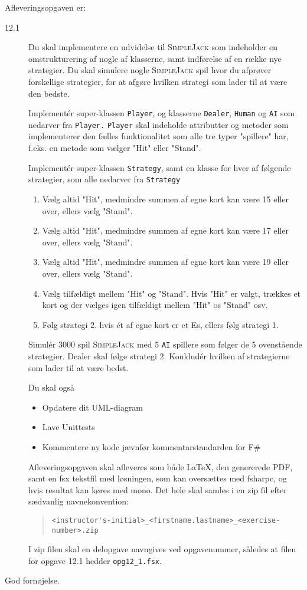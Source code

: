 \documentclass[a4paper,12pt]{article}
\newcommand{\sbl}{\textsc{SimpleJack }}
\begin{document}
Afleveringsopgaven er:
\begin{description}
\item[12.1] Du skal implementere en udvidelse til \sbl som indeholder en omstrukturering af nogle af klasserne, samt indførelse af en række nye strategier. Du skal simulere nogle \sbl spil hvor du afprøver forskellige strategier, for at afgøre
  hvilken strategi som lader til at være den bedste.

  Implementér super-klassen \texttt{Player}, og klasserne \texttt{Dealer}, \texttt{Human} og \texttt{AI} som nedarver fra \texttt{Player.} \texttt{Player} skal indeholde attributter og metoder som implementerer den fælles funktionalitet
  som alle tre typer "spillere" har, f.eks. en metode som vælger "Hit" eller "Stand".

  Implementér super-klassen \texttt{Strategy}, samt en klasse for hver af følgende strategier, som alle nedarver fra \texttt{Strategy}
\begin{enumerate}
\item Vælg altid "Hit", medmindre summen af egne kort kan være 15 eller over, ellers vælg "Stand".
\item Vælg altid "Hit", medmindre summen af egne kort kan være 17 eller over, ellers vælg "Stand".
\item Vælg altid "Hit", medmindre summen af egne kort kan være 19 eller over, ellers vælg "Stand".
\item Vælg tilfældigt mellem "Hit" og "Stand". Hvis "Hit" er valgt, trækkes et kort og der vælges igen tilfældigt mellem
"Hit" os "Stand" osv.
\item Følg strategi 2. hvis ét af egne kort er et Es, ellers følg strategi 1.
\end{enumerate}
Simulér 3000 spil \sbl med 5 \texttt{AI} spillere som følger de 5 ovenstående strategier.  Dealer skal følge strategi 2.
Konkludér hvilken af strategierne som lader til at være bedst.

Du skal også
\begin{itemize}
\item Opdatere dit UML-diagram
\item Lave Unittests
\item Kommentere ny kode jævnfør kommentarstandarden for F\#
\end{itemize}
 
Afleveringsopgaven skal afleveres som både LaTeX, den genererede PDF, samt en fsx tekstfil med løsningen, som kan oversættes med fsharpc, og hvis resultat kan køres med mono. Det hele skal samles i en zip fil efter sædvanlig navnekonvention:
\begin{quote}
  \lstinline|<instructor's-initial>_<firstname.lastname>_<exercise-number>.zip|
\end{quote}
I zip filen skal en delopgave navngives ved opgavenummer, således at filen for opgave 12.1 hedder \lstinline|opg12_1.fsx|.
\end{description}

\flushright God fornøjelse.
\end{document}
